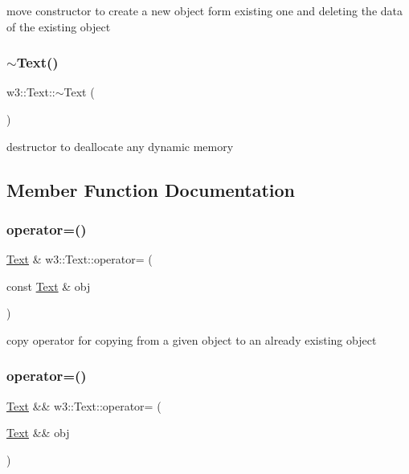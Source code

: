 move constructor to create a new object form existing one and deleting the data of the existing object \mbox{\label{classw3_1_1Text_a599c6614ba05c4cbd3ef9b8968a73ad4}} 
\subsubsection{\texorpdfstring{$\sim$\+Text()}{~Text()}}
{\footnotesize\ttfamily w3\+::\+Text\+::$\sim$\+Text (\begin{DoxyParamCaption}{ }\end{DoxyParamCaption})}

destructor to deallocate any dynamic memory 

\subsection{Member Function Documentation}
\mbox{\label{classw3_1_1Text_a1b87c67fdf7be218346e20308a3e3c11}} 
\subsubsection{\texorpdfstring{operator=()}{operator=()}\hspace{0.1cm}{\footnotesize\ttfamily [1/2]}}
{\footnotesize\ttfamily \mbox{\hyperlink{classw3_1_1Text}{Text}} \& w3\+::\+Text\+::operator= (\begin{DoxyParamCaption}\item[{const \mbox{\hyperlink{classw3_1_1Text}{Text}} \&}]{obj }\end{DoxyParamCaption})}

copy operator for copying from a given object to an already existing object \mbox{\label{classw3_1_1Text_ae65528850526faf4beda6631b2c6d2f0}} 
\subsubsection{\texorpdfstring{operator=()}{operator=()}\hspace{0.1cm}{\footnotesize\ttfamily [2/2]}}
{\footnotesize\ttfamily \mbox{\hyperlink{classw3_1_1Text}{Text}} \&\& w3\+::\+Text\+::operator= (\begin{DoxyParamCaption}\item[{\mbox{\hyperlink{classw3_1_1Text}{Text}} \&\&}]{obj }\end{DoxyParamCaption})}


